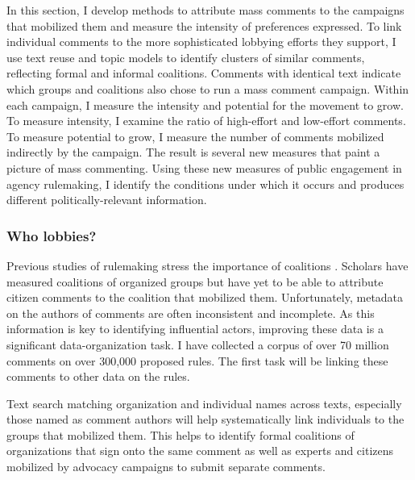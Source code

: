 In this section, I develop methods to attribute mass comments to the campaigns that mobilized them and measure the intensity of preferences expressed. 
To link individual comments to the more sophisticated lobbying efforts they support, I use text reuse and topic models to identify clusters of similar comments, reflecting formal and informal coalitions. Comments with identical text indicate which groups and coalitions also chose to run a mass comment campaign. Within each campaign, I measure the intensity and potential for the movement to grow. To measure intensity, I examine the ratio of high-effort and low-effort comments. To measure potential to grow, I measure the number of comments mobilized indirectly by the campaign.
The result is several new measures that paint a picture of mass commenting. Using these new measures of public engagement in agency rulemaking, I identify the conditions under which it occurs and produces different politically-relevant information. 

\subsubsection{Who lobbies?}
Previous studies of rulemaking stress the importance of coalitions \citep{Yackee2006a}. Scholars have measured coalitions of organized groups but have yet to be able to attribute citizen comments to the coalition that mobilized them.
Unfortunately, metadata on the authors of comments are often inconsistent and incomplete. As this information is key to identifying influential actors, improving these data is a significant data-organization task. I have collected a corpus of over 70 million comments on over 300,000 proposed rules. The first task will be linking these comments to other data on the rules. 

Text search matching organization and individual names across texts, especially those named as comment authors will help systematically link individuals to the groups that mobilized them.%
This helps to identify formal coalitions of organizations that sign onto the same comment as well as experts and citizens mobilized by advocacy campaigns to submit separate comments.

